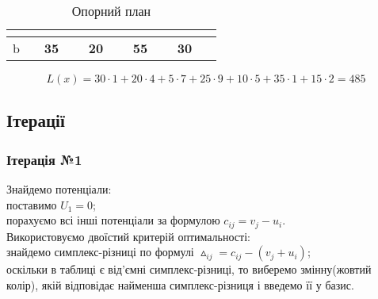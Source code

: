 \documentclass[a4paper, 12pt]{article}
\begin{document}
\begin{table}[H]
\begin{tabular}{|c|cccc|cccc|cccc|cccc|r|}
\cline{2-2}\cline{6-6}\cline{10-10}\cline{14-14}          & \multicolumn{1}{c|}{} &       &       &       & \multicolumn{1}{c|}{} & \multicolumn{2}{c}{} &       & \multicolumn{1}{c|}{} &       &       &       & \multicolumn{1}{c|}{} & \multicolumn{2}{c}{} &       &  \bigstrut\\
    \hline
    b     & \multicolumn{4}{c|}{\textbf{35}} & \multicolumn{4}{c|}{\textbf{20}} & \multicolumn{4}{c|}{\textbf{55}} & \multicolumn{4}{c|}{\textbf{30}} &  \bigstrut\\
    \hline
    \end{tabular}%
  \caption{Опорний план}
  \label{tab:plan}%
\end{table}%

\[ L(x) = 30\cdot1+20\cdot4+5\cdot7+25\cdot9+10\cdot5+35\cdot1+15\cdot2 = 485 \]

\newpage
\subsection{Ітерації}

\subsubsection{Ітерація №1}

Знайдемо потенціали:\\
поставимо $U_1 = 0$;\\
порахуємо всі інші потенціали за формулою $c_{ij} = v_j - u_i$.\\
Використовуємо двоїстий критерій оптимальності:\\
знайдемо симплекс-різниці по формулі $\vartriangle_{ij} = c_{ij} - (v_j + u_i) $;\\
оскільки в таблиці є від'ємні симплекс-різниці, то виберемо змінну(жовтий колір), якій відповідає найменша симплекс-різниця і введемо її у базис.
\end{document}
